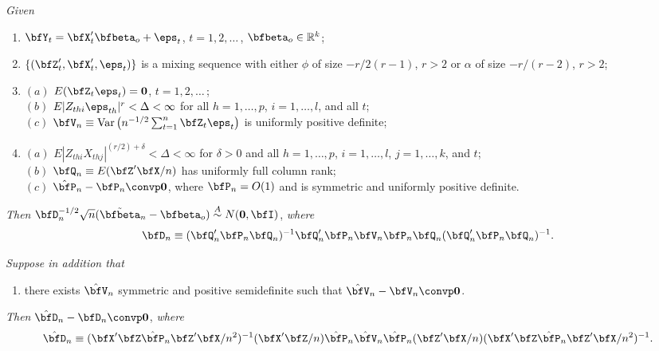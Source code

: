 \begin{theorem}\label{thm:iv-dhd-clt}
\textit{Given}
\begin{enumerate}
\item[$(i)$] $\bfY_t = \bfX_t'\bfbeta_o + \eps_t$, $t = 1, 2, \ldots$\,, $\bfbeta_o \in \mathbb{R}^k$;
\item[$(ii)$] $\{(\bfZ_t', \bfX_t', \eps_t)\}$ is a mixing sequence with either $\phi$ of size $-r/2(r-1)$, $r > 2$ or $\alpha$ of size $-r/(r-2)$, $r > 2$;
\item[$(iii)$] $(a)$ $E(\bfZ_t \eps_t) = \mathbf{0}$, \quad $t = 1, 2, \ldots$\,;\\
$(b)$ $E|Z_{thi}\eps_{th}|^r < \Delta < \infty$ for all $h = 1, \ldots, p$, $i = 1, \ldots, l$, and all $t$;\\
$(c)$ $\bfV_n \equiv \Var\left(n^{-1/2}\sum_{t=1}^{n}\bfZ_t\eps_t\right)$ is uniformly positive definite;
\item[$(iv)$] $(a)$ $E|Z_{thi}X_{thj}|^{(r/2)+\delta} < \Delta < \infty$ for $\delta > 0$ and all $h = 1, \ldots, p$, $i = 1, \ldots, l$, $j = 1, \ldots, k$, and $t$;\\
$(b)$ $\bfQ_n \equiv E(\bfZ'\bfX/n)$ has uniformly full column rank;\\
$(c)$ $\hat{\bfP}_n - \bfP_n \convp \mathbf{0}$, where $\bfP_n = O(1)$ and is symmetric and uniformly positive definite.
\end{enumerate}

\textit{Then} $\bfD_n^{-1/2}\sqrt{n}(\tilde{\bfbeta}_n - \bfbeta_o) \overset{A}{\sim} N(\mathbf{0}, \bfI)$, \textit{where}
\[
\bfD_n \equiv (\bfQ_n'\bfP_n\bfQ_n)^{-1}\bfQ_n'\bfP_n\bfV_n\bfP_n\bfQ_n(\bfQ_n'\bfP_n\bfQ_n)^{-1}.
\]

\textit{Suppose in addition that}

\begin{enumerate}
\item[$(v)$] there exists $\hat{\bfV}_n$ symmetric and positive semidefinite such that $\hat{\bfV}_n - \bfV_n \convp \mathbf{0}$.
\end{enumerate}

\textit{Then} $\hat{\bfD}_n - \bfD_n \convp \mathbf{0}$, \textit{where}
\[
\hat{\bfD}_n \equiv (\bfX'\bfZ\hat{\bfP}_n\bfZ'\bfX/n^2)^{-1}(\bfX'\bfZ/n)\hat{\bfP}_n\hat{\bfV}_n\hat{\bfP}_n(\bfZ'\bfX/n)(\bfX'\bfZ\hat{\bfP}_n\bfZ'\bfX/n^2)^{-1}.
\]
\end{theorem}

